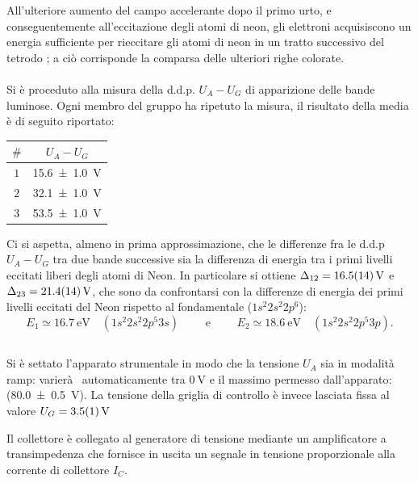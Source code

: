 		All'ulteriore aumento del campo accelerante dopo il
		primo urto, e conseguentemente all'eccitazione degli
		atomi di neon, gli elettroni acquisiscono un energia
		sufficiente per rieccitare gli atomi
		di neon in un tratto successivo del tetrodo ;
		a ciò corrisponde la comparsa delle ulteriori righe colorate.
\paragraph{}
	Si è proceduto alla misura della d.d.p. $U_A-U_G$ di apparizione delle bande luminose. Ogni membro del gruppo ha ripetuto la misura, il risultato della media è di seguito riportato:

	\begin{table}[H]
 		\centering
		\begin{tabular}{cc}
 			\toprule
 			$\#$  &  $U_A- U_G$\\
  			\midrule
  			$1$ & \SI{15.6 \pm 1.0}{\volt}\\
  			$2$ &  \SI{32.1 \pm 1.0}{\volt}\\
  			$3$ & \SI{53.5 \pm 1.0}{\volt}\\
  			\bottomrule
 		\end{tabular}
	\label{tab:a}
	\end{table}



	Ci si aspetta, almeno in prima approssimazione, che le differenze fra le d.d.p $U_A-U_G$ tra due bande successive sia la differenza di energia tra i primi livelli eccitati liberi degli atomi di Neon.
	In particolare si ottiene $\Delta_{12} = \SI{16.5 \pm 1.4}{\volt}$ e $\Delta_{23} = \SI{21.4 \pm 1.4}{\volt}$, che sono da confrontarsi con la differenze di energia dei primi livelli eccitati del Neon rispetto al fondamentale ($1s^2 2s^2 2p^6$):
	$$E_1 \simeq \SI{16.7}{\eV} \quad (1s^2 2s^2 2p^5 3s) \qquad \text{ e } \qquad E_2 \simeq \SI{18.6}{\eV} \quad (1s^2 2s^2 2p^5 3p).$$

\subsection{}
	Si è settato l'apparato strumentale in modo che
	la tensione $U_A$ sia in modalità ramp: varierà  automaticamente tra $\SI{0}{\volt}$ e il massimo permesso dall'apparato:
	(\SI{80.0 \pm 0.5}{\volt}). La tensione della griglia di controllo è invece lasciata fissa al valore
	$U_G = \SI{3.5 \pm 0.1}{\V}$

Il collettore è collegato al generatore di tensione mediante un amplificatore a transimpedenza
	che fornisce in uscita un segnale in tensione proporzionale alla corrente di collettore $I_C$.

